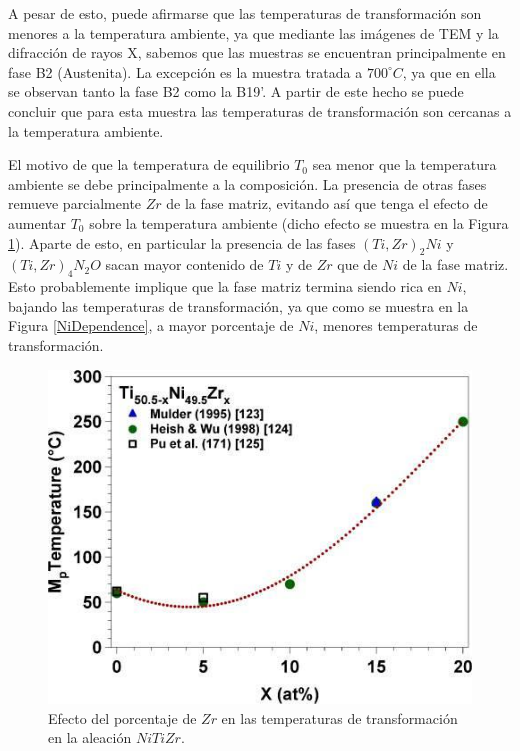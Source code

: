 \documentclass[12pt]{article}
\theoremstyle{definition}
\theoremstyle{remark}
\begin{document}
A pesar de esto, puede afirmarse que las temperaturas de transformación son menores a la temperatura ambiente, ya que mediante las imágenes de TEM y la difracción de rayos X, sabemos que las muestras se encuentran principalmente en fase B2 (Austenita). La excepción es la muestra tratada a $700^\circ C$, ya que en ella se observan tanto la fase B2 como la B19'. A partir de este hecho se puede concluir que para esta muestra las temperaturas de transformación son cercanas a la temperatura ambiente.

El motivo de que la temperatura de equilibrio $T_0$ sea menor que la temperatura ambiente se debe principalmente a la composición. La presencia de otras fases remueve parcialmente $Zr$ de la fase matriz, evitando así que tenga el efecto de aumentar $T_0$ sobre la temperatura ambiente (dicho efecto se muestra en la Figura \ref{ZrDependence}). Aparte de esto, en particular la presencia de las fases $(Ti, Zr)_2 Ni$ y $(Ti, Zr)_4 N_2O$ sacan mayor contenido de $Ti$ y de $Zr$ que de $Ni$ de la fase matriz. Esto probablemente implique que la fase matriz termina siendo rica en $Ni$, bajando las temperaturas de transformación, ya que como se muestra en la Figura \ref{NiDependence}, a mayor porcentaje de $Ni$, menores temperaturas de transformación.

\begin{figure}[H]
 	\centering
	\includegraphics[scale=0.7]{img/MsZrDependence.jpeg}
 	\caption{Efecto del porcentaje de $Zr$ en las temperaturas de transformación en la aleación $NiTiZr$. }
	\label{ZrDependence}
\end{figure}
\end{document}
